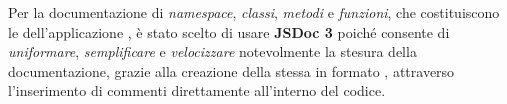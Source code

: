 Per la documentazione di \emph{namespace}, \emph{classi}, \emph{metodi} e \emph{funzioni}, che costituiscono le  dell'applicazione , è stato scelto di usare \textbf{JSDoc 3} poiché consente di \emph{uniformare},  \emph{semplificare} e \emph{velocizzare} notevolmente la stesura della documentazione, grazie alla creazione della stessa in formato , attraverso l'inserimento di commenti direttamente all'interno del codice.
